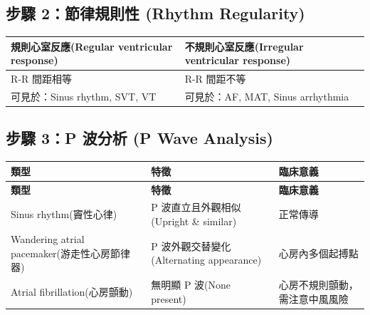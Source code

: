 \documentclass[12pt,a4paper]{article}
\begin{document}
\subsection{步驟 2：節律規則性 (Rhythm Regularity)}


\begin{longtable}{p{6.5cm}p{7cm}}
\toprule
\textbf{規則心室反應}\newline (Regular ventricular response) & \textbf{不規則心室反應}\newline (Irregular ventricular response) \\
\midrule
\endfirsthead
R-R 間距相等 & R-R 間距不等 \\
可見於：Sinus rhythm, SVT, VT & 可見於：AF, MAT, Sinus arrhythmia \\
\bottomrule
\end{longtable}

\subsection{步驟 3：P 波分析 (P Wave Analysis)}

\begin{longtable}{p{4cm}p{4.5cm}p{5cm}}
\toprule
\textbf{類型} & \textbf{特徵} & \textbf{臨床意義} \\
\midrule
\endfirsthead
\toprule
\textbf{類型} & \textbf{特徵} & \textbf{臨床意義} \\
\midrule
\endhead
\bottomrule
\endfoot
Sinus rhythm\newline (竇性心律) & P 波直立且外觀相似\newline (Upright \& similar) & 正常傳導 \\
\midrule
Wandering atrial pacemaker\newline (游走性心房節律器) & P 波外觀交替變化\newline (Alternating appearance) & 心房內多個起搏點 \\
\midrule
Atrial fibrillation\newline (心房顫動) & 無明顯 P 波\newline (None present) & 心房不規則顫動，\newline 需注意中風風險 \\
\bottomrule
\end{longtable}

\newpage
\end{document}
